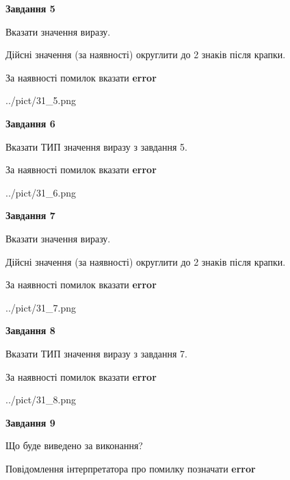 \documentclass[11pt, ukrainian]{article}
\begin{document}
{\begin {large}
{\begin {center}\textbf{Завдання 5}\end {center}}\par
Вказати значення виразу. \par
Дійсні значення (за наявності) округлити до 2 знаків після крапки. \par
За наявності помилок вказати \textbf{error}

\begin{center}
	{../pict/31_5.png}
\end{center}
\newpage

{\begin {center}\textbf{Завдання 6}\end {center}}\par
Вказати ТИП значення виразу з завдання 5. \par
За наявності помилок вказати \textbf{error}

\begin{center}
	{../pict/31_6.png}
\end{center}
\newpage

{\begin {center}\textbf{Завдання 7}\end {center}}\par
Вказати значення виразу. \par
Дійсні значення (за наявності) округлити до 2 знаків після крапки. \par
За наявності помилок вказати \textbf{error}

\begin{center}
	{../pict/31_7.png}
\end{center}
\newpage

{\begin {center}\textbf{Завдання 8}\end {center}}\par
Вказати ТИП значення виразу з завдання 7. \par
За наявності помилок вказати \textbf{error}

\begin{center}
	{../pict/31_8.png}
\end{center}
\newpage

{\begin {center}\textbf{Завдання 9}\end {center}}\par
Що буде виведено за виконання? \par
Повідомлення інтерпретатора про помилку позначати \textbf{error}


\end{large}}
\end{document}
